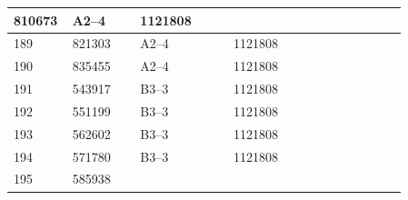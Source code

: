 \documentclass[UTF8,10pt,a4paper,fontset=fandol]{ctexart}
\newcommand{\fieldvalue}[1]{#1}
\begin{document}
\begin{tabular}{|p{0.07\linewidth}|p{0.16\linewidth}|p{0.22\linewidth}|p{0.23\linewidth}|p{0.18\linewidth}|}
\fieldvalue{810673} &
\fieldvalue{A2--4} &
\fieldvalue{1121808} & \\
\hline
\fieldvalue{189} &
\fieldvalue{821303} &
\fieldvalue{A2--4} &
\fieldvalue{1121808} & \\
\hline
\fieldvalue{190} &
\fieldvalue{835455} &
\fieldvalue{A2--4} &
\fieldvalue{1121808} & \\
\hline
\fieldvalue{191} &
\fieldvalue{543917} &
\fieldvalue{B3--3} &
\fieldvalue{1121808} & \\
\hline
\fieldvalue{192} &
\fieldvalue{551199} &
\fieldvalue{B3--3} &
\fieldvalue{1121808} & \\
\hline
\fieldvalue{193} &
\fieldvalue{562602} &
\fieldvalue{B3--3} &
\fieldvalue{1121808} & \\
\hline
\fieldvalue{194} &
\fieldvalue{571780} &
\fieldvalue{B3--3} &
\fieldvalue{1121808} & \\
\hline
\fieldvalue{195} &
\fieldvalue{585938} &

\end{tabular}
\end{document}

